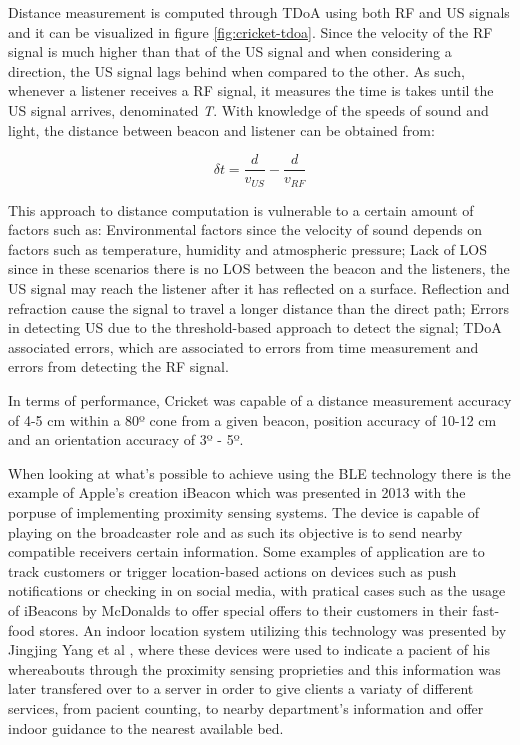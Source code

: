 Distance measurement is computed through \ac{TDoA} using both \ac{RF} and \ac{US} signals and it can be visualized in figure \ref{fig:cricket-tdoa}. Since the velocity of the \ac{RF} signal is much higher than that of the \ac{US} signal and when considering a direction, the \ac{US} signal lags behind when compared to the other. As such, whenever a listener receives a \ac{RF} signal, it measures the time is takes until the \ac{US} signal arrives, denominated \textit{\delta T}. With knowledge of the speeds of sound and light, the distance between beacon and listener can be obtained from:

$$ \delta t = \frac{d}{v_{US}} - \frac{d}{v_{RF}}  $$

This approach to distance computation is vulnerable to a certain amount of factors such as: Environmental factors since the velocity of sound depends on factors such as temperature, humidity and atmospheric pressure; Lack of \ac{LOS} since in these scenarios there is no \ac{LOS} between the beacon and the listeners, the \ac{US} signal may reach the listener after it has reflected on a surface. Reflection and refraction cause the signal to travel a longer distance than the direct path; Errors in detecting \ac{US} due to the threshold-based approach to detect the signal; \ac{TDoA} associated errors, which are associated to errors from time measurement and errors from detecting the \ac{RF} signal.

In terms of performance, Cricket was capable of a distance measurement accuracy of 4-5 cm within a 80º cone from a given beacon, position accuracy of 10-12 cm and an orientation accuracy of 3º - 5º.



\label{subsec:ble}
	

When looking at what's possible to achieve using the BLE technology there is the example of Apple's creation iBeacon \cite{ibeacon} which was presented in 2013 with the porpuse of implementing proximity sensing systems. The device is capable of playing on the broadcaster role and as such its objective is to send nearby compatible receivers certain information. Some examples of application are to track customers or trigger location-based actions on devices such as push notifications or checking in on social media, with pratical cases such as the usage of iBeacons by McDonalds to offer special offers to their customers in their fast-food stores. An indoor location system utilizing this technology was presented by Jingjing Yang et al \cite{ibeacon1}, where these devices were used to indicate a pacient of his whereabouts through the proximity sensing proprieties and this information was later transfered over to a server in order to give clients a variaty of different services, from pacient counting, to nearby department's information and offer indoor guidance to the nearest available bed. 


